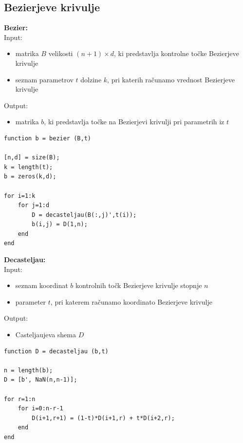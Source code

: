 \documentclass[12pt,a4paper,twoside]{article}
\theoremstyle{definition} %
\theoremstyle{plain} %
\numberwithin{equation}{section}  %
\begin{document}
\newpage

\subsection{Bezierjeve krivulje}

\textbf{Bezier:}\\
Input:
\begin{itemize}
\item matrika $B$ velikosti $(n+1) \times d$, ki predstavlja kontrolne točke Bezierjeve krivulje
\item seznam parametrov $t$ dolzine $k$, pri katerih računamo vrednost Bezierjeve krivulje
\end{itemize}
Output:
\begin{itemize}
\item matrika $b$, ki predstavlja točke na Bezierjevi krivulji pri parametrih iz $t$
\end{itemize}

\begin{lstlisting}[caption = {bezier}]
function b = bezier (B,t)

[n,d] = size(B);
k = length(t);
b = zeros(k,d);

for i=1:k
    for j=1:d
        D = decasteljau(B(:,j)',t(i));
        b(i,j) = D(1,n);
    end
end
\end{lstlisting}

\vspace{1cm}
\textbf{Decasteljau:}\\
Input:
\begin{itemize}
\item seznam koordinat $b$ kontrolnih točk Bezierjeve krivulje stopnje $n$
\item parameter $t$, pri katerem računamo koordinato Bezierjeve krivulje
\end{itemize}
Output:
\begin{itemize}
\item Casteljaujeva shema $D$
\end{itemize}

\begin{lstlisting}[caption = {decasteljau}]
function D = decasteljau (b,t) 

n = length(b);
D = [b', NaN(n,n-1)];

for r=1:n
    for i=0:n-r-1
        D(i+1,r+1) = (1-t)*D(i+1,r) + t*D(i+2,r);
    end
end
\end{lstlisting}

\newpage
\end{document}

